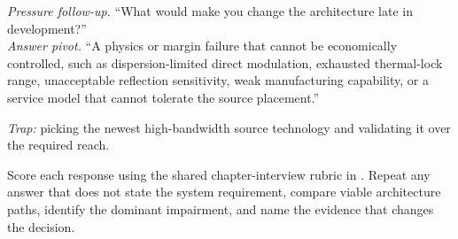 \textit{Pressure follow-up.} ``What would make you change the architecture late
in development?''\\
\textit{Answer pivot.} ``A physics or margin failure that cannot be
economically controlled, such as dispersion-limited direct modulation,
exhausted thermal-lock range, unacceptable reflection sensitivity, weak
manufacturing capability, or a service model that cannot tolerate the source
placement.''

\textit{Trap:} picking the newest high-bandwidth source technology and
validating it over the required reach.

Score each response using the shared chapter-interview rubric in
. Repeat any answer that does not state the
system requirement, compare viable architecture paths, identify the dominant
impairment, and name the evidence that changes the decision.

